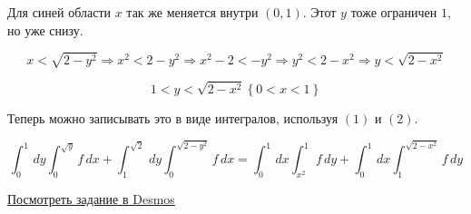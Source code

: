 Для синей области $x$ так же меняется внутри $(0,1)$. Этот $y$ тоже ограничен $1$, но уже снизу.

$$x<\sqrt{2-y^{2}} \Rightarrow x^2 < 2-y^2 \Rightarrow x^2-2 < -y^2 \Rightarrow y^2 < 2-x^2  \Rightarrow y < \sqrt{2-x^2}$$

\begin{equation}
    1 < y < \sqrt{2-x^2}\left\{0 < x < 1\right\}
\end{equation}

Теперь можно записывать это в виде интегралов, используя $(1)$ и $(2)$.

$$\int_{0}^{1}\, dy \int_{0}^{\sqrt{y}} f \, dx  + \int_{1}^{\sqrt{2}} \, dy\int_{0}^{\sqrt{2-y^2}} f \, dx = \int_{0}^{1}\, dx \int_{x^2}^{1} f \, dy  + \int_{0}^{1} \, dx\int_{1}^{\sqrt{2-x^2}} f \, dy $$

\href{https://www.desmos.com/Calculator/klqig4obxo}{Посмотреть задание в Desmos}
